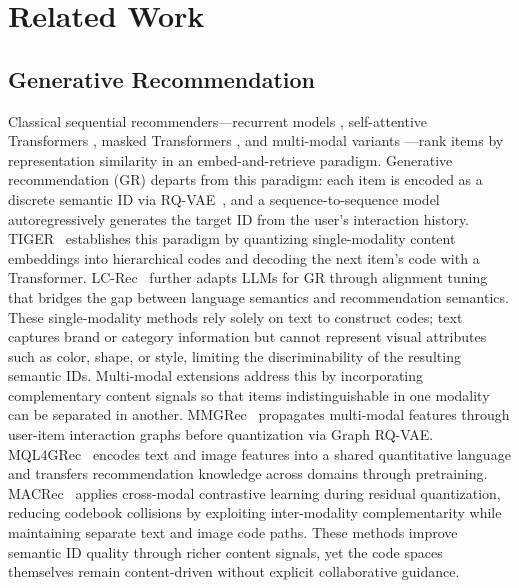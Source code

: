 \documentclass[sigconf, anonymous, review]{acmart}
\begin{document}

\section{Related Work}

\subsection{Generative Recommendation}

Classical sequential recommenders---recurrent models \cite{gru4rec}, self-atten\-tive Transformers \cite{sasrec}, masked Transformers \cite{sun2019bert4rec}, and multi-modal variants \cite{wei2019mmgcn,wang2023missrec}---rank items by representation similarity in an embed-and-retrieve paradigm.
%
Generative recommendation (GR) departs from this paradigm: each item is encoded as a discrete semantic ID via RQ-VAE~\cite{vqvae,image_rqvae}, and a sequence-to-sequence model autoregressively generates the target ID from the user's interaction history.
%
TIGER~\cite{tiger} establishes this paradigm by quantizing single-modality content embeddings into hierarchical codes and decoding the next item's code with a Transformer.
%
LC-Rec~\cite{LCRec} further adapts LLMs for GR through alignment tuning that bridges the gap between language semantics and recommendation semantics.
%
These single-modality methods rely solely on text to construct codes; text captures brand or category information but cannot represent visual attributes such as color, shape, or style, limiting the discriminability of the resulting semantic IDs.
%
Multi-modal extensions address this by incorporating complementary content signals so that items indistinguishable in one modality can be separated in another.
%
MMGRec~\cite{liu2024mmgrec} propagates multi-modal features through user-item interaction graphs before quantization via Graph RQ-VAE.
%
MQL4GRec~\cite{mql} encodes text and image features into a shared quantitative language and transfers recommendation knowledge across domains through pretraining.
%
MACRec~\cite{macrec} applies cross-modal contrastive learning during residual quantization, reducing codebook collisions by exploiting inter-modality complementarity while maintaining separate text and image code paths.
%
These methods improve semantic ID quality through richer content signals, yet the code spaces themselves remain content-driven without explicit collaborative guidance.
\end{document}
